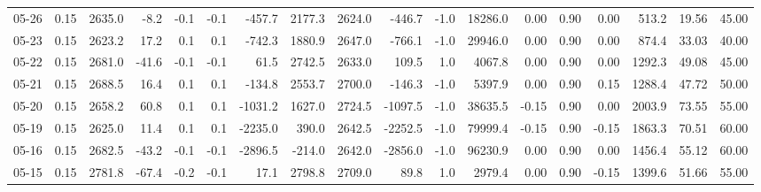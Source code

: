 \begin{threeparttable}
{\begin{tabular}{lrrrrrrrrrrrrrrrrr}
  05-26 &     0.15 & 2635.0 &              -8.2 &              -0.1 &               -0.1 &             -457.7 &  2177.3 & 2624.0 &     -446.7 &                     -1.0 &             18286.0 &       0.00 &      0.90 &           0.00 &            513.2 &           19.56 &                  45.00 \\
  05-23 &     0.15 & 2623.2 &              17.2 &               0.1 &                0.1 &             -742.3 &  1880.9 & 2647.0 &     -766.1 &                     -1.0 &             29946.0 &       0.00 &      0.90 &           0.00 &            874.4 &           33.03 &                  40.00 \\
  05-22 &     0.15 & 2681.0 &             -41.6 &              -0.1 &               -0.1 &               61.5 &  2742.5 & 2633.0 &      109.5 &                      1.0 &              4067.8 &       0.00 &      0.90 &           0.00 &           1292.3 &           49.08 &                  45.00 \\
  05-21 &     0.15 & 2688.5 &              16.4 &               0.1 &                0.1 &             -134.8 &  2553.7 & 2700.0 &     -146.3 &                     -1.0 &              5397.9 &       0.00 &      0.90 &           0.15 &           1288.4 &           47.72 &                  50.00 \\
  05-20 &     0.15 & 2658.2 &              60.8 &               0.1 &                0.1 &            -1031.2 &  1627.0 & 2724.5 &    -1097.5 &                     -1.0 &             38635.5 &      -0.15 &      0.90 &           0.00 &           2003.9 &           73.55 &                  55.00 \\
  05-19 &     0.15 & 2625.0 &              11.4 &               0.1 &                0.1 &            -2235.0 &   390.0 & 2642.5 &    -2252.5 &                     -1.0 &             79999.4 &      -0.15 &      0.90 &          -0.15 &           1863.3 &           70.51 &                  60.00 \\
  05-16 &     0.15 & 2682.5 &             -43.2 &              -0.1 &               -0.1 &            -2896.5 &  -214.0 & 2642.0 &    -2856.0 &                     -1.0 &             96230.9 &       0.00 &      0.90 &           0.00 &           1456.4 &           55.12 &                  60.00 \\
  05-15 &     0.15 & 2781.8 &             -67.4 &              -0.2 &               -0.1 &               17.1 &  2798.8 & 2709.0 &       89.8 &                      1.0 &              2979.4 &       0.00 &      0.90 &          -0.15 &           1399.6 &           51.66 &                  55.00 \\

\end{tabular}}
\end{threeparttable}
